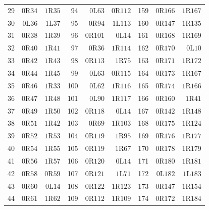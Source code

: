 {\begin{longtable}{@{}rrrrrrrrr@{}}
29 & $0\mathrm{R}34$ & $1\mathrm{R}35$ & 94 & $0\mathrm{L}63$ & $0\mathrm{R}112$ & 159 & $0\mathrm{R}166$ & $1\mathrm{R}167$\\
30 & $0\mathrm{L}36$ & $1\mathrm{L}37$ & 95 & $0\mathrm{R}94$ & $1\mathrm{L}113$ & 160 & $0\mathrm{R}147$ & $1\mathrm{R}135$\\
31 & $0\mathrm{R}38$ & $1\mathrm{R}39$ & 96 & $0\mathrm{R}101$ & $0\mathrm{L}14$ & 161 & $0\mathrm{R}168$ & $1\mathrm{R}169$\\
32 & $0\mathrm{R}40$ & $1\mathrm{R}41$ & 97 & $0\mathrm{R}36$ & $1\mathrm{R}114$ & 162 & $0\mathrm{R}170$ & $0\mathrm{L}10$\\
33 & $0\mathrm{R}42$ & $1\mathrm{R}43$ & 98 & $0\mathrm{R}113$ & $1\mathrm{R}75$ & 163 & $0\mathrm{R}171$ & $1\mathrm{R}172$\\
34 & $0\mathrm{R}44$ & $1\mathrm{R}45$ & 99 & $0\mathrm{L}63$ & $0\mathrm{R}115$ & 164 & $0\mathrm{R}173$ & $1\mathrm{R}167$\\
35 & $0\mathrm{R}46$ & $1\mathrm{R}33$ & 100 & $0\mathrm{L}62$ & $1\mathrm{R}116$ & 165 & $0\mathrm{R}174$ & $1\mathrm{R}166$\\
36 & $0\mathrm{R}47$ & $1\mathrm{R}48$ & 101 & $0\mathrm{L}90$ & $1\mathrm{R}117$ & 166 & $0\mathrm{R}160$ & $1\mathrm{R}41$\\
37 & $0\mathrm{R}49$ & $1\mathrm{R}50$ & 102 & $0\mathrm{R}118$ & $0\mathrm{L}14$ & 167 & $0\mathrm{R}142$ & $1\mathrm{R}148$\\
38 & $0\mathrm{R}51$ & $1\mathrm{R}42$ & 103 & $0\mathrm{R}69$ & $1\mathrm{R}103$ & 168 & $0\mathrm{R}175$ & $1\mathrm{R}124$\\
39 & $0\mathrm{R}52$ & $1\mathrm{R}53$ & 104 & $0\mathrm{R}119$ & $1\mathrm{R}95$ & 169 & $0\mathrm{R}176$ & $1\mathrm{R}177$\\
40 & $0\mathrm{R}54$ & $1\mathrm{R}55$ & 105 & $0\mathrm{R}119$ & $1\mathrm{R}67$ & 170 & $0\mathrm{R}178$ & $1\mathrm{R}179$\\
41 & $0\mathrm{R}56$ & $1\mathrm{R}57$ & 106 & $0\mathrm{R}120$ & $0\mathrm{L}14$ & 171 & $0\mathrm{R}180$ & $1\mathrm{R}181$\\
42 & $0\mathrm{R}58$ & $0\mathrm{R}59$ & 107 & $0\mathrm{R}121$ & $1\mathrm{L}71$ & 172 & $0\mathrm{L}182$ & $1\mathrm{L}183$\\
43 & $0\mathrm{R}60$ & $0\mathrm{L}14$ & 108 & $0\mathrm{R}122$ & $1\mathrm{R}123$ & 173 & $0\mathrm{R}147$ & $1\mathrm{R}154$\\
44 & $0\mathrm{R}61$ & $1\mathrm{R}62$ & 109 & $0\mathrm{R}112$ & $1\mathrm{R}109$ & 174 & $0\mathrm{R}172$ & $1\mathrm{R}184$\\

\end{longtable}}
